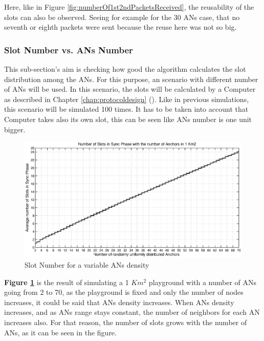 Here, like in Figure \ref{fig:numberOf1st2ndPacketsReceived}, the reusability of the slots can also be observed. Seeing for example for the 
30 \acp{AN} case, that no seventh or eighth packets were sent because the reuse here was not so big.

\subsubsection{Slot Number vs. \acp{AN} Number}

This sub-section's aim is checking how good the algorithm calculates the slot distribution among the \acp{AN}. For this purpose, an scenario 
with different number of \acp{AN} will be used. In this scenario, the slots will be calculated by a Computer as described in Chapter 
\ref{chap:protocoldesign} (). Like in previous simulations, this scenario will be simulated 100 times. It has to
be taken into account that Computer takes also its own slot, this can be seen like \acp{AN} number is one unit bigger.

\begin{figure}[ht]
 \begin{center}
  \includegraphics[width=1\textwidth]{numberOfSlotsWithTheAnchorDensity.eps}
 \end{center}
 \caption{Slot Number for a variable \acp{AN} density}
 \label{fig:numberOfSlotsWithTheAnchorDensity}
\end{figure}

\textbf{Figure \ref{fig:numberOfSlotsWithTheAnchorDensity}} is the result of simulating a 1 $Km^2$ playground with a number of \acp{AN} going from 
2 to 70, as the playground is fixed and only the number of nodes increases, it could be said that \acp{AN} density increases. When \acp{AN} density 
increases, and as \acp{AN} range stays constant, the number of neighbors for each \ac{AN} increases also. For that reason, the number of slots grows 
with the number of \acp{AN}, as it can be seen in the figure.


